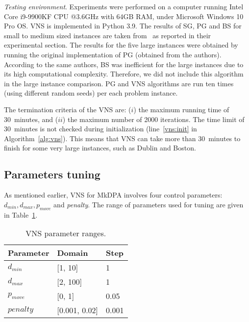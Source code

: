 \documentclass[dvipsnames,format=sigconf,anonymous=true,review=true]{acmart}
\begin{document}
 
 \emph{Testing environment}. Experiments were performed on a computer running Intel Core i9-9900KF CPU @3.6GHz with 64GB RAM, under Microsoft Windows 10 Pro OS. VNS is implemented in Python 3.9. The results of SG, PG and BS for small to medium sized instances are taken from~\cite{corcoran2021heuristics} as reported in their experimental section. The results for the five large instances were obtained by running the original implementation of PG (obtained from the authors). According to the same authors, BS was inefficient for the large instances due to its high computational complexity. Therefore, we did not include this algorithm in the large instance comparison.  
 PG and VNS algorithms are run ten times (using different random seeds) per each problem instance. 
 
  The termination criteria of the VNS are: ($i$) the maximum running time of 30~minutes, and ($ii$) the maximum number of 2000 iterations. The time limit of 30~minutes is not checked during initialization (line~\ref{vns:init} in Algorithm~\ref{alg:vns}). This means that VNS can take more than 30~minutes to finish for some very large instances, such as Dublin and Boston. 
   
\subsection{Parameters tuning}
   As mentioned earlier, VNS for MkDPA involves four control parameters: $d_{min}, d_{max}, p_{move}$ and \emph{penalty}. The range of parameters used for tuning are given in Table~\ref{tab:domain_tuning}.
   
    \begin{table}[ht]
    	\caption{VNS parameter ranges.}  
    	\label{tab:domain_tuning}
   	\begin{tabular}{lll}
    Parameter       & Domain & Step \\ \hline
   	$d_{min}$  &  [1, 10] & 1 \\
   	$d_{max}$  & [2, 100] & 1\\
   	$p_{move}$    & [0, 1] & 0.05 \\
   	$penalty$ & [0.001, 0.02]  & 0.001 \\ \hline
   	\end{tabular}
   \end{table}
   
\end{document}
